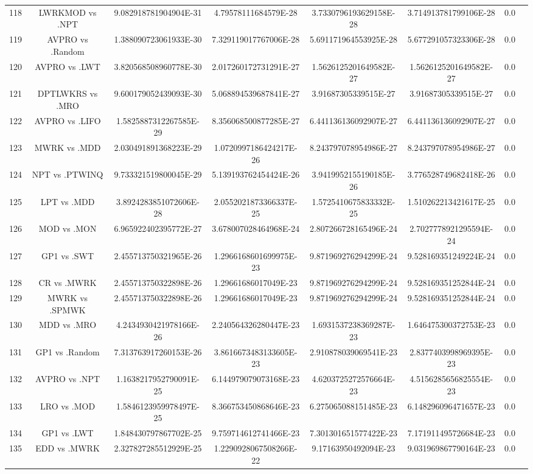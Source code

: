 \documentclass[a3paper,10pt]{article}
\begin{document}
\begin{table}[!htp]
\begin{tabular}{cccccccc}
118&LWRKMOD vs .NPT&9.082918781904904E-31&4.79578111684579E-28&3.7330796193629158E-28&3.714913781799106E-28&0.0\\
119&AVPRO vs .Random&1.388090723061933E-30&7.329119017767006E-28&5.691171964553925E-28&5.677291057323306E-28&0.0\\
120&AVPRO vs .LWT&3.820568508960778E-30&2.017260172731291E-27&1.5626125201649582E-27&1.5626125201649582E-27&0.0\\
121&DPTLWKRS vs .MRO&9.600179052439093E-30&5.068894539687841E-27&3.91687305339515E-27&3.91687305339515E-27&0.0\\
122&AVPRO vs .LIFO&1.5825887312267585E-29&8.356068500877285E-27&6.441136136092907E-27&6.441136136092907E-27&0.0\\
123&MWRK vs .MDD&2.030491891368223E-29&1.0720997186424217E-26&8.243797078954986E-27&8.243797078954986E-27&0.0\\
124&NPT vs .PTWINQ&9.733321519800045E-29&5.139193762454424E-26&3.9419952155190185E-26&3.776528749682418E-26&0.0\\
125&LPT vs .MDD&3.8924283851072606E-28&2.0552021873366337E-25&1.5725410675833332E-25&1.510262213421617E-25&0.0\\
126&MOD vs .MON&6.965922402395772E-27&3.678007028464968E-24&2.807266728165496E-24&2.7027778921295594E-24&0.0\\
127&GP1 vs .SWT&2.455713750321965E-26&1.2966168601699975E-23&9.871969276294299E-24&9.528169351249224E-24&0.0\\
128&CR vs .MWRK&2.455713750322898E-26&1.29661686017049E-23&9.871969276294299E-24&9.528169351252844E-24&0.0\\
129&MWRK vs .SPMWK&2.455713750322898E-26&1.29661686017049E-23&9.871969276294299E-24&9.528169351252844E-24&0.0\\
130&MDD vs .MRO&4.2434930421978166E-26&2.240564326280447E-23&1.6931537238369287E-23&1.646475300372753E-23&0.0\\
131&GP1 vs .Random&7.313763917260153E-26&3.8616673483133605E-23&2.910878039069541E-23&2.8377403998969395E-23&0.0\\
132&AVPRO vs .NPT&1.1638217952790091E-25&6.144979079073168E-23&4.6203725272576664E-23&4.5156285656825554E-23&0.0\\
133&LRO vs .MOD&1.5846123959978497E-25&8.366753450868646E-23&6.275065088151485E-23&6.148296096471657E-23&0.0\\
134&GP1 vs .LWT&1.848430797867702E-25&9.759714612741466E-23&7.301301651577422E-23&7.171911495726684E-23&0.0\\
135&EDD vs .MWRK&2.327827285512929E-25&1.2290928067508266E-22&9.17163950492094E-23&9.031969867790164E-23&0.0\\

\end{tabular}
\end{table}
\end{document}
